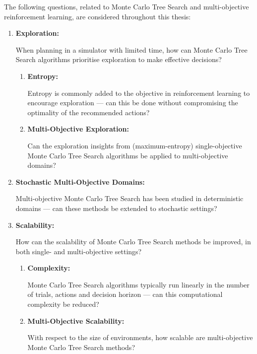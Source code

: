     The following questions, related to Monte Carlo Tree Search and multi-objective reinforcement learning, are considered throughout this thesis:
    \begin{enumerate}[start=1, label={\textbf{Q\arabic* -}}]
        \item \hypertarget{q1}{\textbf{Exploration:}} When planning in a simulator with limited time, how can Monte Carlo Tree Search algorithms prioritise exploration to make effective decisions?
        
        \begin{enumerate}[start=1, label={\textbf{Q1.\arabic* -}}]
            \item \hypertarget{q11}{\textbf{Entropy:}} Entropy is commonly added to the objective in reinforcement learning to encourage exploration --- can this be done without compromising the optimality of the recommended actions?
            \item \hypertarget{q12}{\textbf{Multi-Objective Exploration:}} Can the exploration insights from (maximum-entropy) single-objective Monte Carlo Tree Search algorithms be applied to multi-objective domains?
        \end{enumerate}

        \item \hypertarget{q2}{\textbf{Stochastic Multi-Objective Domains:}} Multi-objective Monte Carlo Tree Search has been studied in deterministic domains --- can these methods be extended to stochastic settings?

        \item \hypertarget{q3}{\textbf{Scalability:}} How can the scalability of Monte Carlo Tree Search methods be improved, in both single- and multi-objective settings?

        \begin{enumerate}[start=1, label={\textbf{Q3.\arabic* -}}]
            \item \hypertarget{q31}{\textbf{Complexity:}} Monte Carlo Tree Search algorithms typically run linearly in the number of trials, actions and decision horizon --- can this computational complexity be reduced?
            \item \hypertarget{q32}{\textbf{Multi-Objective Scalability:}} With respect to the size of environments, how scalable are multi-objective Monte Carlo Tree Search methods?
        \end{enumerate}
    \end{enumerate}

